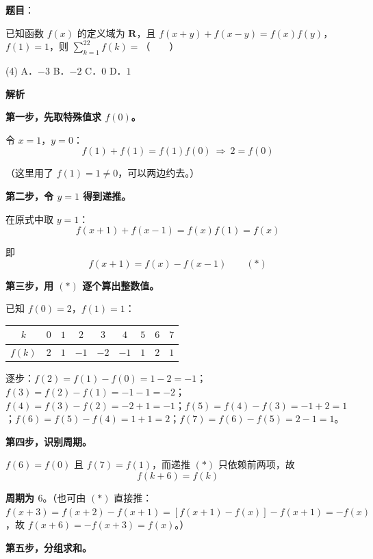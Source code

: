 \begin{answer}

\textbf{题目}：

已知函数 $f(x)$ 的定义域为 $\mathbf R$，且 $f(x+y)+f(x-y)=f(x)f(y)$，$f(1)=1$，则 $\displaystyle\sum_{k=1}^{22}f(k)=$\mbox{（　　）}

\begin{gkopts}(4)
\task A．$-3$
\task B．$-2$
\task C．$0$
\task D．$1$
\end{gkopts}

\textbf{解析}

\textbf{第一步，先取特殊值求 $f(0)$。}

令 $x=1$，$y=0$：
\nopagebreak[4]
\[f(1)+f(1)=f(1)f(0)\ \Longrightarrow\ 2=f(0)\]

（这里用了 $f(1)=1\ne0$，可以两边约去。）

\textbf{第二步，令 $y=1$ 得到递推。}

在原式中取 $y=1$：
\nopagebreak[4]
\[f(x+1)+f(x-1)=f(x)f(1)=f(x)\]

即
\nopagebreak[4]
\[f(x+1)=f(x)-f(x-1)\qquad(\ast)\]

\textbf{第三步，用 $(\ast)$ 逐个算出整数值。}

已知 $f(0)=2$，$f(1)=1$：

\begin{center}
\begingroup\setlength{\tabcolsep}{4pt}
\begin{tabular}{ccccccccc}
\toprule
$k$ & $0$ & $1$ & $2$ & $3$ & $4$ & $5$ & $6$ & $7$ \\
\midrule
$f(k)$ & $2$ & $1$ & $-1$ & $-2$ & $-1$ & $1$ & $2$ & $1$ \\
\bottomrule
\end{tabular}
\endgroup
\end{center}

逐步：$f(2)=f(1)-f(0)=1-2=-1$；$f(3)=f(2)-f(1)=-1-1=-2$；$f(4)=f(3)-f(2)=-2+1=-1$；$f(5)=f(4)-f(3)=-1+2=1$；$f(6)=f(5)-f(4)=1+1=2$；$f(7)=f(6)-f(5)=2-1=1$。

\textbf{第四步，识别周期。}

$f(6)=f(0)$ 且 $f(7)=f(1)$，而递推 $(\ast)$ 只依赖前两项，故
\nopagebreak[4]
\[f(k+6)=f(k)\]

\textbf{周期为 $6$}。（也可由 $(\ast)$ 直接推：$f(x+3)=f(x+2)-f(x+1)=\left[f(x+1)-f(x)\right]-f(x+1)=-f(x)$，故 $f(x+6)=-f(x+3)=f(x)$。）

\textbf{第五步，分组求和。}


\end{answer}
